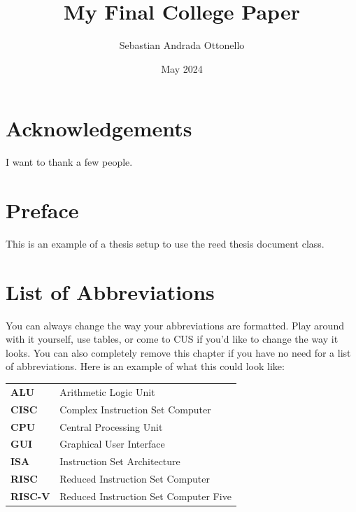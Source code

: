 \documentclass[12pt,twoside]{reedthesis}
\title{My Final College Paper}
\author{Sebastian Andrada Ottonello}
\date{May 2024}
\begin{document}
\maketitle
\frontmatter %
\pagestyle{empty} %

\chapter*{Acknowledgements}
I want to thank a few people.

\chapter*{Preface}
This is an example of a thesis setup to use the reed thesis document class.



\chapter*{List of Abbreviations}
You can always change the way your abbreviations are formatted. Play around with it yourself, use tables, or come to CUS if you'd like to change the way it looks. You can also completely remove this chapter if you have no need for a list of abbreviations. Here is an example of what this could look like:

\begin{table}[h]
	\centering %
	\begin{tabular}{ll}
		\textbf{ALU}    & Arithmetic Logic Unit                 \\
		\textbf{CISC}   & Complex Instruction Set Computer      \\
		\textbf{CPU}    & Central Processing Unit               \\
		\textbf{GUI}    & Graphical User Interface              \\
		\textbf{ISA}    & Instruction Set Architecture          \\
		\textbf{RISC}   & Reduced Instruction Set Computer      \\
		\textbf{RISC-V} & Reduced Instruction Set Computer Five \\
	\end{tabular}
\end{table}
\end{document}
